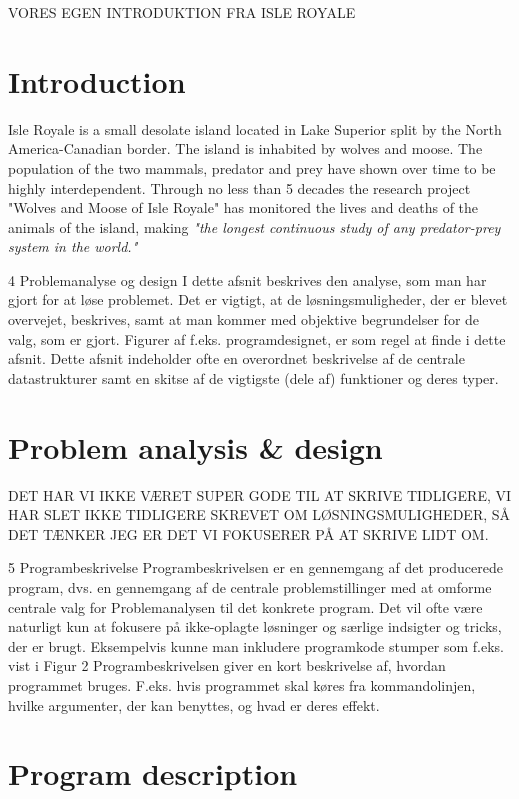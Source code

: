 \documentclass[a4paper]{report}
\begin{document}
VORES EGEN INTRODUKTION FRA ISLE ROYALE 
\section*{Introduction}
Isle Royale is a small desolate island located in Lake Superior split by the North America-Canadian border. The island is inhabited by wolves and moose. The population of the two mammals, predator and prey have shown over time to be highly interdependent.
Through no less than 5 decades the research project "Wolves and Moose of Isle Royale" has monitored the lives and deaths of the animals of the island, making \textit{"the longest continuous study of any predator-prey system in the world."}

4 Problemanalyse og design
I dette afsnit beskrives den analyse, som man har gjort for at løse problemet. Det er vigtigt, at de
løsningsmuligheder, der er blevet overvejet, beskrives, samt at man kommer med objektive begrundelser
for de valg, som er gjort. Figurer af f.eks. programdesignet, er som regel at finde i dette afsnit. Dette
afsnit indeholder ofte en overordnet beskrivelse af de centrale datastrukturer samt en skitse af de vigtigste
(dele af) funktioner og deres typer.

\section*{Problem analysis \& design}
DET HAR VI IKKE VÆRET SUPER GODE TIL AT SKRIVE TIDLIGERE, VI HAR SLET IKKE TIDLIGERE SKREVET OM LØSNINGSMULIGHEDER, SÅ DET TÆNKER JEG ER DET VI FOKUSERER PÅ AT SKRIVE LIDT OM.



5 Programbeskrivelse
Programbeskrivelsen er en gennemgang af det producerede program, dvs. en gennemgang af de centrale
problemstillinger med at omforme centrale valg for Problemanalysen til det konkrete program. Det vil
ofte være naturligt kun at fokusere på ikke-oplagte løsninger og særlige indsigter og tricks, der er brugt.
Eksempelvis kunne man inkludere programkode stumper som f.eks. vist i Figur 2
Programbeskrivelsen giver en kort beskrivelse af, hvordan programmet bruges. F.eks. hvis programmet
skal køres fra kommandolinjen, hvilke argumenter, der kan benyttes, og hvad er deres effekt.

\section*{Program description}
\end{document}
